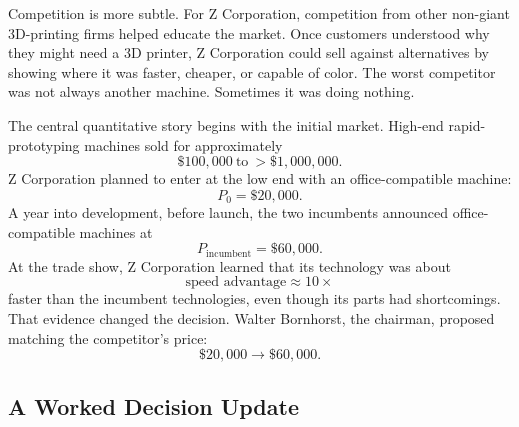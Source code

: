 Competition is more subtle. For Z Corporation, competition from other non-giant 3D-printing firms helped educate the market. Once customers understood why they might need a 3D printer, Z Corporation could sell against alternatives by showing where it was faster, cheaper, or capable of color. The worst competitor was not always another machine. Sometimes it was doing nothing.

The central quantitative story begins with the initial market. High-end rapid-prototyping machines sold for approximately
\begin{equation}
\$100{,}000\ \text{to}\ >\$1{,}000{,}000.
\end{equation}
Z Corporation planned to enter at the low end with an office-compatible machine:
\begin{equation}
P_0=\$20{,}000.
\end{equation}
A year into development, before launch, the two incumbents announced office-compatible machines at
\begin{equation}
P_{\text{incumbent}}=\$60{,}000.
\end{equation}
At the trade show, Z Corporation learned that its technology was about
\begin{equation}
\text{speed advantage}\approx 10\times
\end{equation}
faster than the incumbent technologies, even though its parts had shortcomings. That evidence changed the decision. Walter Bornhorst, the chairman, proposed matching the competitor's price:
\begin{equation}
\$20{,}000\longrightarrow \$60{,}000.
\end{equation}

\subsection{A Worked Decision Update}


